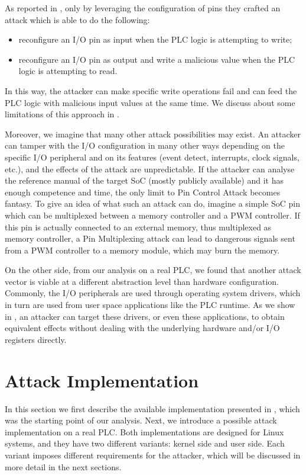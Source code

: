 As reported in \cite{ghostplc}, only by leveraging the configuration of pins they crafted an attack which is able to do the following:
\begin{itemize}
	\item reconfigure an I/O pin as input when the PLC logic is attempting to write;
	\item reconfigure an I/O pin as output and write a malicious value when the PLC logic is attempting to read.
\end{itemize}
In this way, the attacker can make specific write operations fail and can feed the PLC logic with malicious input values at the same time.
We discuss about some limitations of this approach in .

Moreover, we imagine that many other attack possibilities may exist. An attacker can tamper with the I/O configuration in many other ways depending on the
specific I/O peripheral and on its features (\eg event detect, interrupts, clock signals, etc.), and the effects of the attack are unpredictable.
If the attacker can analyse the reference manual of the target SoC (mostly publicly available) and it has enough competence and time,
the only limit to Pin Control Attack becomes fantasy.
To give an idea of what such an attack can do, imagine a simple SoC pin which can be multiplexed between a memory controller and a PWM controller.
If this pin is actually connected to an external memory, thus multiplexed as memory controller, a Pin Multiplexing attack can lead to dangerous signals
sent from a PWM controller to a memory module, which may burn the memory.

On the other side, from our analysis on a real PLC, we found that another attack vector is viable at a different abstraction level than hardware configuration.
Commonly, the I/O peripherals are used through operating system drivers, which in turn are used from user space applications like the PLC runtime.
As we show in , an attacker can target these drivers, or even these applications, to obtain equivalent effects without dealing with
the underlying hardware and/or I/O registers directly.


\section{Attack Implementation}
\label{sec:attack_impl}

In this section we first describe the available implementation presented in \cite{ghostplc}, which was the starting point of our analysis.
Next, we introduce a possible attack implementation on a real PLC. Both implementations are designed for Linux systems, and they have two different
variants: kernel side and user side. Each variant imposes different requirements for the attacker, which will be discussed in more detail in the next sections.


